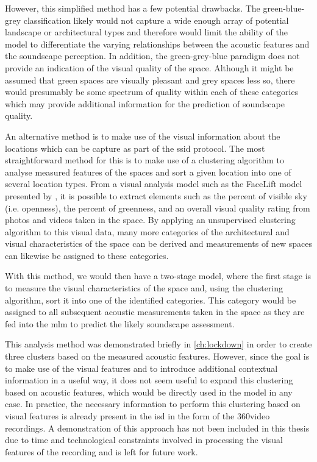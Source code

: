 However, this simplified method has a few potential drawbacks. The green-blue-grey classification likely would not capture a wide enough array of potential landscape or architectural types and therefore would limit the ability of the model to differentiate the varying relationships between the acoustic features and the soundscape perception. In addition, the green-grey-blue paradigm does not provide an indication of the visual quality of the space. Although it might be assumed that green spaces are visually pleasant and grey spaces less so, there would presumably be some spectrum of quality within each of these categories which may provide additional information for the prediction of soundscape quality.

An alternative method is to make use of the visual information about the locations which can be capture as part of the \gls{ssid} protocol. The most straightforward method for this is to make use of a clustering algorithm to analyse measured features of the spaces and sort a given location into one of several location types. From a visual analysis model such as the FaceLift model presented by \citet{Joglekar2020Facelift}, it is possible to extract elements such as the percent of visible sky (i.e. openness), the percent of greenness, and an overall visual quality rating from photos and videos taken in the space. By applying an unsupervised clustering algorithm to this visual data, many more categories of the architectural and visual characteristics of the space can be derived and measurements of new spaces can likewise be assigned to these categories. 

With this method, we would then have a two-stage model, where the first stage is to measure the visual characteristics of the space and, using the clustering algorithm, sort it into one of the identified categories. This category would be assigned to all subsequent acoustic measurements taken in the space as they are fed into the \gls{mlm} to predict the likely soundscape assessment.

This analysis method was demonstrated briefly in \cref{ch:lockdown} in order to create three clusters based on the measured acoustic features. However, since the goal is to make use of the visual features and to introduce additional contextual information in a useful way, it does not seem useful to expand this clustering based on acoustic features, which would be directly used in the model in any case. In practice, the necessary information to perform this clustering based on visual features is already present in the \gls{isd} in the form of the 360\textdegree video recordings. A demonstration of this approach has not been included in this thesis due to time and technological constraints involved in processing the visual features of the recording and is left for future work. 

